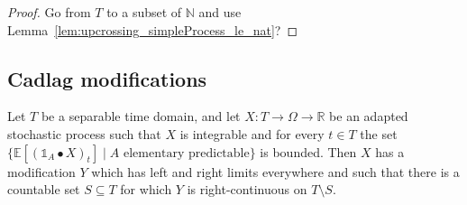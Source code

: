 \begin{proof}
Go from $T$ to a subset of $\mathbb{N}$ and use Lemma~\ref{lem:upcrossing_simpleProcess_le_nat}?


\end{proof}



\subsection{Cadlag modifications}


\begin{theorem}\label{thm:exists_rightContinuous_modification_of_bounded_elemStochIntegral}
Let $T$ be a separable time domain, and let $X : T \to \Omega \to \mathbb{R}$ be an adapted stochastic process such that $X$ is integrable and for every $t \in T$ the set $\{\mathbb{E}[(\mathbb{1}_A \bullet X)_t] \mid A \text{ elementary predictable}\}$ is bounded.
Then $X$ has a modification $Y$ which has left and right limits everywhere and such that there is a countable set $S \subseteq T$ for which $Y$ is right-continuous on $T \setminus S$.
\end{theorem}

